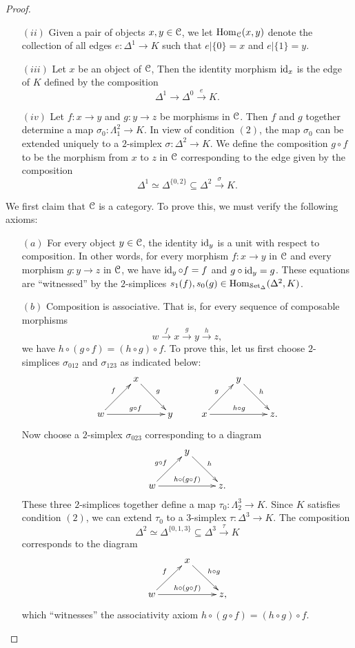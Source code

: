 \begin{1.1.2 inf-Categories}
\begin{proof}
\begin{itemize}
\item[$(ii)$] Given a pair of objects $x, y \in \operatorname{\mathcal{C}}$, we let
$\operatorname{Hom}_{\operatorname{\mathcal{C}}}(x,y)$ denote the collection of all edges
$e: \Delta^1 \rightarrow K$ such that $e|\{0\} =x$ and $e| \{1\} = y$.

\item[$(iii)$] Let $x$ be an object of $\operatorname{\mathcal{C}}$, Then the identity morphism
$\operatorname{id}_{x}$ is the edge of $K$ defined by the composition
$$ \Delta^1 \rightarrow \Delta^0 \stackrel{e}{\rightarrow} K.$$

\item[$(iv)$] Let $f: x \rightarrow y$ and $g: y \rightarrow z$ be morphisms
in $\operatorname{\mathcal{C}}$. Then $f$ and $g$ together determine a map
$\sigma_0: \Lambda^2_1 \rightarrow K$. In view of condition $(2)$, the map
$\sigma_0$ can be extended uniquely to a $2$-simplex $\sigma: \Delta^2 \rightarrow K$.
We define the composition $g \circ f$ to be the morphism from $x$ to $z$ in $\operatorname{\mathcal{C}}$ corresponding
to the edge given by the composition
$$ \Delta^1 \simeq \Delta^{ \{0,2\} } \subseteq \Delta^2 \stackrel{\sigma}{\rightarrow} K.$$
\end{itemize}

We first claim that $\operatorname{\mathcal{C}}$ is a category. To prove this, we must verify the following axioms:
\begin{itemize}
\item[$(a)$] For every object $y \in \operatorname{\mathcal{C}}$, the identity $\operatorname{id}_{y}$ is a unit with respect to composition.
In other words, for every morphism $f: x \rightarrow y$ in $\operatorname{\mathcal{C}}$ and every morphism
$g: y \rightarrow z$ in $\operatorname{\mathcal{C}}$, we have $\operatorname{id}_y \circ f = f$ and $g \circ \operatorname{id}_y = g$.
These equations are ``witnessed'' by the $2$-simplices $s_1(f), s_0(g) \in \operatorname{Hom}_{\operatorname{\mathcal{S}et_{\Delta}}}( \Delta^2, K)$.

\item[$(b)$] Composition is associative. That is, for every sequence of composable morphisms
$$ w \stackrel{f}{\rightarrow} x \stackrel{g}{\rightarrow} y \stackrel{h}{\rightarrow} z,$$
we have $h \circ (g \circ f) = (h \circ g) \circ f$. To prove this, let us first choose
$2$-simplices $\sigma_{0 1 2}$ and $\sigma_{1 2 3}$ as indicated below:
$$ \xymatrix{ & x \ar[dr]^{g} & & & y \ar[dr]^{h} & \\
w \ar[ur]^{f} \ar[rr]^{g \circ f} & & y & x \ar[ur]^{g} \ar[rr]^{h \circ g} & & z. }$$
Now choose a $2$-simplex $\sigma_{0 2 3}$ corresponding to a diagram
$$ \xymatrix{ & y \ar[dr]^{h} & \\
w \ar[ur]^{ g \circ f} \ar[rr]^{ h \circ (g \circ f)} &  & z. }$$
These three $2$-simplices together define a map $\tau_0: \Lambda^3_2 \rightarrow K$.
Since $K$ satisfies condition $(2)$, we can extend $\tau_0$ to a $3$-simplex
$\tau: \Delta^3 \rightarrow K$. The composition
$$ \Delta^2 \simeq \Delta^{ \{0,1,3\}} \subseteq \Delta^3 \stackrel{\tau}{\rightarrow} K$$
corresponds to the diagram
$$ \xymatrix{ & x \ar[dr]^{h \circ g} & \\
w \ar[ur]^{f} \ar[rr]^{ h \circ (g \circ f) } & & z, }$$
which ``witnesses'' the associativity axiom $h \circ (g \circ f) = (h \circ g) \circ f$.
\end{itemize}


\end{proof}
\end{1.1.2 inf-Categories}
